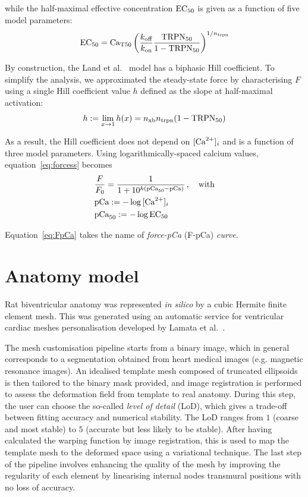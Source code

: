 \noindent
while the half-maximal effective concentration $\textrm{EC}_{50}$ is given as a function of five model parameters:
%
\begin{equation}\label{eq:ec50}
    \textrm{EC}_{50} = \textrm{Ca}_{\textrm{T}50}\left(\frac{k_{\textrm{off}}}{k_{\textrm{on}}}\frac{\textrm{TRPN}_{50}}{1-\textrm{TRPN}_{50}}\right)^{1/n_{\textrm{trpn}}}
\end{equation}

By construction, the Land et al.~\cite{Land:2012} model has a biphasic Hill coefficient. To simplify the analysis, we approximated the steady-state force by characterising $F$ using a single Hill coefficient value $h$ defined as the slope at half-maximal activation:
%
\begin{equation}\label{eq:h}
    h := \lim_{x\to1}h(x) = n_{\textrm{xb}}n_{\textrm{trpn}}(1-\textrm{TRPN}_{50})
\end{equation}

\noindent
As a result, the Hill coefficient does not depend on $[\textrm{Ca}^{2+}]_{i}$ and is a function of three model parameters. Using logarithmically-spaced calcium values, equation~\eqref{eq:forcess} becomes
%
\begin{align}\label{eq:FpCa}
    & \frac{F}{F_0} = \frac{1}{1+10^{h(\textrm{pCa}_{50}-\textrm{pCa})}}\,,\quad\text{with} \\
    & \textrm{pCa}:=-\log{[\textrm{Ca}^{2+}]_{i}} \\
    & \textrm{pCa}_{50}:=-\log{\textrm{EC}_{50}}
\end{align}

\noindent
Equation~\eqref{eq:FpCa} takes the name of \textit{force-pCa} (\acs{F-pCa}) \textit{curve}.


%
%
%
\section{Anatomy model}\label{sec:ch2anatomy}
Rat biventricular anatomy was represented \textit{in silico} by a cubic Hermite finite element mesh. This was generated using an automatic service for ventricular cardiac meshes personalisation developed by Lamata et al.~\cite{Lamata:2011, Lamata:2014}.

\vspace{0.2cm}
The mesh customisation pipeline starts from a binary image, which in general corresponds to a segmentation obtained from heart medical images (e.g. magnetic resonance images). An idealised template mesh composed of truncated ellipsoids is then tailored to the binary mask provided, and image registration is performed to assess the deformation field from template to real anatomy. During this step, the user can choose the so-called \textit{level of detail} (\acs{LoD}), which gives a trade-off between fitting accuracy and numerical stability. The LoD ranges from $1$ (coarse and most stable) to $5$ (accurate but less likely to be stable). After having calculated the warping function by image registration, this is used to map the template mesh to the deformed space using a variational technique. The last step of the pipeline involves enhancing the quality of the mesh by improving the regularity of each element by linearising internal nodes transmural positions with no loss of accuracy.

